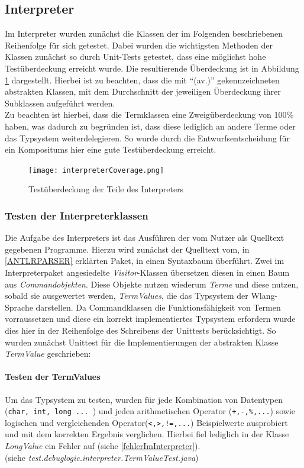 \documentclass[parskip=full]{scrartcl}
\begin{document}
\subsection{Interpreter}
Im Interpreter wurden zunächst die Klassen der im Folgenden beschriebenen Reihenfolge für sich getestet. 
Dabei wurden die wichtigsten Methoden der Klassen zunächst so durch Unit-Tests getestet, dass eine möglichst hohe Testüberdeckung erreicht wurde. Die resultierende Überdeckung ist in Abbildung \ref{AbdeckungImInterpreter} dargestellt. Hierbei ist zu beachten, dass die mit \enquote{(av.)} gekennzeichneten abstrakten Klassen, mit dem Durchschnitt der jeweiligen Überdeckung ihrer Subklassen aufgeführt werden. \\ Zu beachten ist hierbei, dass die Termklassen eine Zweigüberdeckung von 100\% haben, was dadurch zu begründen ist, dass diese lediglich an andere Terme oder das Typsystem weiterdelegieren. So wurde durch die Entwurfsentscheidung für ein Kompositums hier eine gute Testüberdeckung erreicht.
\begin{figure}[!h]
\centering
\texttt{[image: interpreterCoverage.png]}
\caption{Testüberdeckung der Teile des Interpreters}\label{AbdeckungImInterpreter}
\end{figure}


\subsubsection{Testen der Interpreterklassen}
Die Aufgabe des Interpreters ist das Ausführen der vom Nutzer als Quelltext gegebenen Programme. Hierzu wird zunächst der Quelltext vom, in \ref{ANTLRPARSER} erklärten Paket, in einen Syntaxbaum überführt.
Zwei im Interpreterpaket angesiedelte \textit{Visitor}-Klassen übersetzen diesen in einen Baum aus \textit{Commandobjekten}. Diese Objekte nutzen wiederum \textit{Terme} und diese nutzen, sobald sie ausgewertet werden, \textit{TermValues}, die das Typsystem der Wlang-Sprache darstellen. 
Da Commandklassen die Funktionsfähigkeit von Termen vorraussetzen und diese ein korrekt implementiertes Typsystem erfordern wurde dies hier in der Reihenfolge des Schreibens der Unittests berücksichtigt.
So wurden zunächst Unittest für die Implementierungen der abstrakten Klasse \textit{TermValue} geschrieben:
\paragraph{Testen der TermValues}
Um das Typsystem zu testen, wurden für jede Kombination von Datentypen (\texttt{char, int, long ... }) und jeden arithmetischen Operator (\texttt{+,-,\%,...}) sowie logischen und vergleichenden Operator(\texttt{<,>,!=,...}) Beispielwerte ausprobiert und mit dem korrekten Ergebnis verglichen. Hierbei fiel lediglich in der Klasse \textit{LongValue} ein Fehler auf (siehe \ref{fehlerImInterpreter}).\\
(siehe \textit{test.debuglogic.interpreter.TermValueTest.java})
\end{document}
